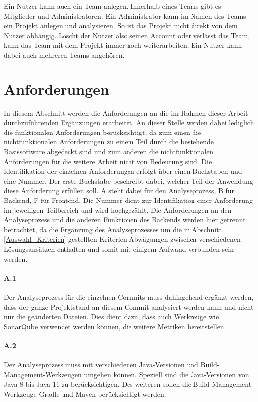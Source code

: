 \documentclass[
	oneside,  %
	ngerman, 
	final, 
	11pt, 
	a4paper, 
	1.1headlines, 
	headinclude=false, 
	footinclude=false, 
	mpinclude=false, 
	pagesize, 
	onecolumn, 
	titlepage, 
	parskip=half, 
	headsepline, 
	chapterprefix=false, 
	version=first, 
	listof=totoc, 
	bibliography=totoc, 
	toc=graduated, 
	fleqn
]{scrbook}
\begin{document}
Ein Nutzer kann auch ein Team anlegen.
Innerhalb eines Teams gibt es Mitglieder und Administratoren.
Ein Administrator kann im Namen des Teams ein Projekt anlegen und analysieren.
So ist das Projekt nicht direkt von dem Nutzer abhängig.
Löscht der Nutzer also seinen Account oder verlässt das Team, kann das Team mit dem Projekt immer noch weiterarbeiten.
Ein Nutzer kann dabei auch mehreren Teams angehören.

\section{Anforderungen}
\label{Anforderungen}
In diesem Abschnitt werden die Anforderungen an die im Rahmen dieser Arbeit durchzuführenden Ergänzungen erarbeitet.
An dieser Stelle werden dabei lediglich die funktionalen Anforderungen berücksichtigt, da zum einen die nichtfunktionalen Anforderungen zu einem Teil durch die bestehende Basissoftware abgedeckt sind und zum anderen die nichtfunktionalen Anforderungen für die weitere Arbeit nicht von Bedeutung sind.
Die Identifikation der einzelnen Anforderungen erfolgt über einen Buchstaben und eine Nummer.
Der erste Buchstabe beschreibt dabei, welcher Teil der Anwendung diese Anforderung erfüllen soll.
\glqq A\grqq{} steht dabei für den Analyseprozess, \glqq B\grqq{} für Backend, \glqq F\grqq{} für Frontend.
Die Nummer dient zur Identifikation einer Anforderung im jeweiligen Teilbereich und wird hochgezählt.
Die Anforderungen an den Analyseprozess und die anderen Funktionen des Backends werden hier getrennt betrachtet, da die Ergänzung des Analyseprozesses um die in Abschnitt \ref{Auswahl_Kriterien} gestellten Kriterien Abwägungen zwischen verschiedenen Lösungsansätzen enthalten und somit mit einigem Aufwand verbunden sein werden.

\paragraph{A.1}
Der Analyseprozess für die einzelnen Commits muss dahingehend ergänzt werden, dass der ganze Projektstand an diesem Commit analysiert werden kann und nicht nur die geänderten Dateien.
Dies dient dazu, dass auch Werkzeuge wie SonarQube verwendet werden können, die weitere Metriken bereitstellen.

\paragraph{A.2}
Der Analyseprozess muss mit verschiedenen Java-Versionen und Build-Management-Werkzeugen umgehen können.
Speziell sind die Java-Versionen von Java 8 bis Java 11 zu berücksichtigen.
Des weiteren sollen die Build-Management-Werkzeuge Gradle und Maven berücksichtigt werden.
\end{document}
